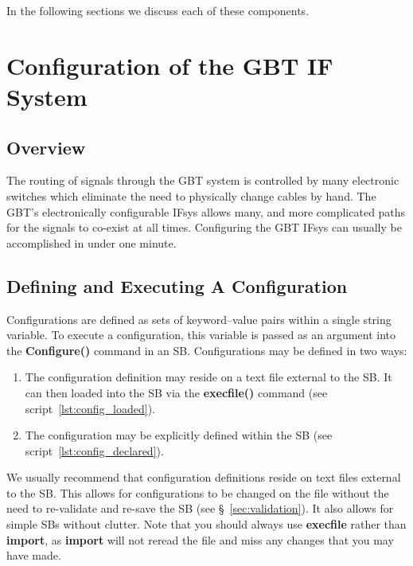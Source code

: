 \noindent In the following sections we discuss each of these components.


\section{Configuration of the GBT IF System}\label{sec:config}

\subsection{Overview}

The routing of signals through the \gls{GBT} system is controlled by many electronic
switches which eliminate the need to physically change cables by hand.  The \gls{GBT}'s
electronically configurable \gls{IFsys} allows many, and more complicated paths for
the signals to co-exist at all times.  Configuring the \gls{GBT} \gls{IFsys} can
usually be accomplished in under one minute.

\subsection{Defining and Executing A Configuration}\label{sec:config_define}

\noindent Configurations are defined as sets of keyword--value pairs within a single
string variable. To execute a configuration, this variable is passed as an argument
into the {\bfseries{\textcolor{pythonKeywords}{Configure}}()} command in an \gls{SB}.
Configurations may be defined in two ways:

\begin{enumerate}
\item The configuration definition may reside on a text file external to the \gls{SB}.
It can then loaded into the \gls{SB} via the
{\bfseries{\textcolor{pythonKeywords}{execfile}()}} command
(see script~\ref{lst:config_loaded}).
\item The configuration may be explicitly defined within the \gls{SB}
(see script~\ref{lst:config_declared}).
\end{enumerate}

\newpage

We usually recommend that configuration definitions reside on text files external to
the \gls{SB}. This allows for configurations to be changed on the file without the
need to re-validate and re-save the \gls{SB} (see \S~\ref{sec:validation}). It also
allows for simple \glspl{SB} without clutter.  Note that you should always use
{\bfseries{\textcolor{pythonKeywords}{execfile}}} rather than
{\bfseries{\textcolor{pythonKeywords}{import}}}, as
{\bfseries{\textcolor{pythonKeywords}{import}}} will not reread the file and miss any
changes that you may have made.

